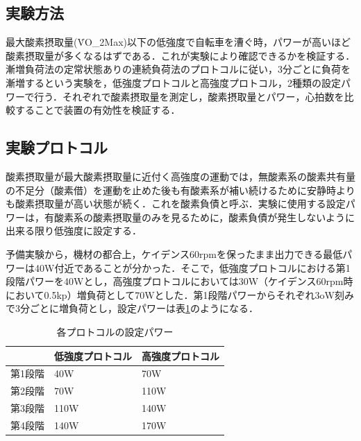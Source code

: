 


\subsection{実験方法}

最大酸素摂取量(\.{V}O_2Max)以下の低強度で自転車を漕ぐ時，パワーが高いほど酸素摂取量が多くなるはずである．これが実験により確認できるかを検証する．漸増負荷法の定常状態ありの連続負荷法のプロトコルに従い\cite{science_of_vo2}，3分ごとに負荷を漸増するという実験を，低強度プロトコルと高強度プロトコル，2種類の設定パワーで行う．それぞれで酸素摂取量を測定し，酸素摂取量とパワー，心拍数を比較することで装置の有効性を検証する．

\subsection{実験プロトコル}

酸素摂取量が最大酸素摂取量に近付く高強度の運動では，無酸素系の酸素共有量の不足分（酸素借）を運動を止めた後も有酸素系が補い続けるために安静時よりも酸素摂取量が高い状態が続く．これを酸素負債と呼ぶ．実験に使用する設定パワーは，有酸素系の酸素摂取量のみを見るために，酸素負債が発生しないように出来る限り低強度に設定する．

予備実験から，機材の都合上，ケイデンス60rpmを保ったまま出力できる最低パワーは40W付近であることが分かった．そこで，低強度プロトコルにおける第1段階パワーを40Wとし，高強度プロトコルにおいては30W（ケイデンス60rpm時において0.5kp）増負荷として70Wとした．第1段階パワーからそれぞれ3oW刻みで3分ごとに増負荷とし，設定パワーは表\ref{tb:protocol_power}のようになる．

\begin{table}[H]
\begin{center}
  \caption{各プロトコルの設定パワー}
  \label{tb:protocol_power}
  \begin{tabular}{|l|l|l|}
  \hline
       & 低強度プロトコル & 高強度プロトコル \\ \hline
  第1段階 & 40W      & 70W      \\ \hline
  第2段階 & 70W      & 110W     \\ \hline
  第3段階 & 110W     & 140W     \\ \hline
  第4段階 & 140W     & 170W     \\ \hline
  \end{tabular}
\end{center}
\end{table}

